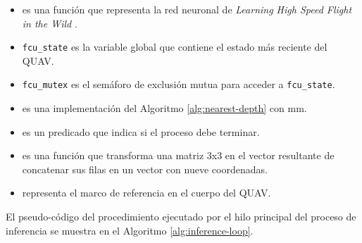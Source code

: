 \begin{itemize}
    \item {} es una función que representa la red neuronal de \textit{Learning High Speed Flight in the Wild} \cite{Loquercio2021}.
    \item \texttt{fcu\_state} es la variable global que contiene el estado más reciente del QUAV.
    \item \texttt{fcu\_mutex} es el semáforo de exclusión mutua para acceder a \texttt{fcu\_state}.
    \item {} es una implementación del Algoritmo \ref{alg:nearest-depth} con  mm.
    \item {} es un predicado que indica si el proceso debe terminar.
    \item {} es una función que transforma una matriz 3x3 en el vector resultante de concatenar sus filas en un vector con nueve coordenadas.
    \item {} representa el marco de referencia en el cuerpo del QUAV.
\end{itemize}

El pseudo-código del procedimiento ejecutado por el hilo principal del proceso de inferencia se muestra en el Algoritmo \ref{alg:inference-loop}.

